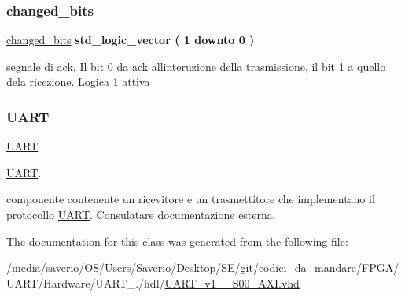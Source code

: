 \subsubsection{\texorpdfstring{changed\+\_\+bits}{changed\_bits}}
{\footnotesize\ttfamily \hyperlink{classUART__v1__0__S00__AXI_1_1arch__imp_a8b1599924c5da95abaa3e673fc0d2cb7}{changed\+\_\+bits} {\bfseries \textcolor{vhdlchar}{std\+\_\+logic\+\_\+vector}\textcolor{vhdlchar}{ }\textcolor{vhdlchar}{(}\textcolor{vhdlchar}{ }\textcolor{vhdlchar}{ } \textcolor{vhdldigit}{1} \textcolor{vhdlchar}{ }\textcolor{vhdlchar}{downto}\textcolor{vhdlchar}{ }\textcolor{vhdlchar}{ } \textcolor{vhdldigit}{0} \textcolor{vhdlchar}{ }\textcolor{vhdlchar}{)}\textcolor{vhdlchar}{ }} \hspace{0.3cm}{\ttfamily [Signal]}}

segnale di ack. Il bit 0 da ack all\textquotesingle{}interuzione della trasmissione, il bit 1 a quello dela ricezione. Logica 1 attiva \mbox{\label{classUART__v1__0__S00__AXI_1_1arch__imp_a6f88b8988ee3bab3eaaa301212c7f804}} 
\subsubsection{\texorpdfstring{U\+A\+RT}{UART}}
{\footnotesize\ttfamily \hyperlink{classUART__v1__0__S00__AXI_1_1arch__imp_a6f88b8988ee3bab3eaaa301212c7f804}{U\+A\+RT} {\bfseries \textcolor{vhdlchar}{ }} \hspace{0.3cm}{\ttfamily [Component]}}



\hyperlink{structUART}{U\+A\+RT}. 

componente contenente un ricevitore e un trasmettitore che implementano il protocollo \hyperlink{structUART}{U\+A\+RT}. Consulatare documentazione esterna. 

The documentation for this class was generated from the following file\+:\begin{DoxyCompactItemize}
\item 
/media/saverio/\+O\+S/\+Users/\+Saverio/\+Desktop/\+S\+E/git/codici\+\_\+da\+\_\+mandare/\+F\+P\+G\+A/\+U\+A\+R\+T/\+Hardware/\+U\+A\+R\+T\+\_./hdl/\hyperlink{UART__v1__0__S00__AXI_8vhd}{U\+A\+R\+T\+\_\+v1\+\_\+\_\+\+S00\+\_\+\+A\+X\+I.\+vhd}\end{DoxyCompactItemize}
